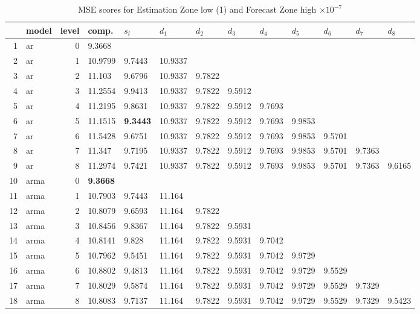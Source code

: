\documentclass[10pt,a4paper]{article}
\begin{document}
\begin{table}[ht]
\centering
\caption{MSE scores for Estimation Zone low (1) and Forecast Zone high $ \times 10^{-7}$} 
\begin{tabular}{rlrllllllllll}
  \hline
 & model & level & comp. & $s_l$ & $d_1$ & $d_2$ & $d_3$ & $d_4$ & $d_5$ & $d_6$ & $d_7$ & $d_8$ \\ 
  \hline
1 & ar &     0 & 9.3668 &  &  &  &  &  &  &  &  &  \\ 
  2 & ar &     1 & 10.9799 & 9.7443 & 10.9337 &  &  &  &  &  &  &  \\ 
  3 & ar &     2 & 11.103 & 9.6796 & 10.9337 & 9.7822 &  &  &  &  &  &  \\ 
  4 & ar &     3 & 11.2554 & 9.9413 & 10.9337 & 9.7822 & 9.5912 &  &  &  &  &  \\ 
  5 & ar &     4 & 11.2195 & 9.8631 & 10.9337 & 9.7822 & 9.5912 & 9.7693 &  &  &  &  \\ 
  6 & ar &     5 & 11.1515 & \textbf{9.3443} & 10.9337 & 9.7822 & 9.5912 & 9.7693 & 9.9853 &  &  &  \\ 
  7 & ar &     6 & 11.5428 & 9.6751 & 10.9337 & 9.7822 & 9.5912 & 9.7693 & 9.9853 & 9.5701 &  &  \\ 
  8 & ar &     7 & 11.347 & 9.7195 & 10.9337 & 9.7822 & 9.5912 & 9.7693 & 9.9853 & 9.5701 & 9.7363 &  \\ 
  9 & ar &     8 & 11.2974 & 9.7421 & 10.9337 & 9.7822 & 9.5912 & 9.7693 & 9.9853 & 9.5701 & 9.7363 & 9.6165 \\ 
   \hline
10 & arma &     0 & \textbf{9.3668} &  &  &  &  &  &  &  &  &  \\ 
  11 & arma &     1 & 10.7903 & 9.7443 & 11.164 &  &  &  &  &  &  &  \\ 
  12 & arma &     2 & 10.8079 & 9.6593 & 11.164 & 9.7822 &  &  &  &  &  &  \\ 
  13 & arma &     3 & 10.8456 & 9.8367 & 11.164 & 9.7822 & 9.5931 &  &  &  &  &  \\ 
  14 & arma &     4 & 10.8141 & 9.828 & 11.164 & 9.7822 & 9.5931 & 9.7042 &  &  &  &  \\ 
  15 & arma &     5 & 10.7962 & 9.5451 & 11.164 & 9.7822 & 9.5931 & 9.7042 & 9.9729 &  &  &  \\ 
  16 & arma &     6 & 10.8802 & 9.4813 & 11.164 & 9.7822 & 9.5931 & 9.7042 & 9.9729 & 9.5529 &  &  \\ 
  17 & arma &     7 & 10.8029 & 9.5874 & 11.164 & 9.7822 & 9.5931 & 9.7042 & 9.9729 & 9.5529 & 9.7329 &  \\ 
  18 & arma &     8 & 10.8083 & 9.7137 & 11.164 & 9.7822 & 9.5931 & 9.7042 & 9.9729 & 9.5529 & 9.7329 & 9.5423 \\ 

\end{tabular}
\end{table}
\end{document}

